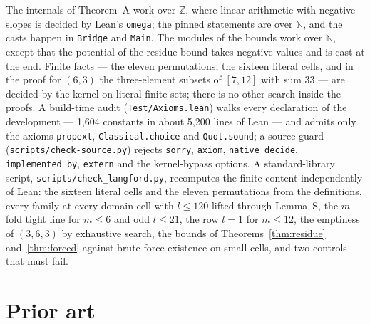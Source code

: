 \documentclass[11pt]{amsart}
\theoremstyle{plain}
\theoremstyle{definition}
\theoremstyle{remark}
\newcommand{\Z}{\mathbb{Z}}
\begin{document}
The internals of Theorem~A work over $\Z$, where linear arithmetic with negative slopes is
decided by Lean's \texttt{omega}; the pinned statements are over $\mathbb{N}$, and the casts
happen in \texttt{Bridge} and \texttt{Main}. The modules of the bounds work over $\mathbb{N}$,
except that the potential of the residue bound takes negative values and is cast at the end. Finite facts --- the eleven permutations, the
sixteen literal cells, and in the proof for $(6,3)$ the three-element subsets of $[7,12]$
with sum $33$ --- are decided by the kernel on literal finite sets; there is no other
search inside the proofs.
A build-time audit (\texttt{Test/Axioms.lean}) walks every declaration of the development
--- 1,604 constants in about 5,200
lines of Lean --- and admits only the axioms
\texttt{propext}, \texttt{Classical.choice} and \texttt{Quot.sound}; a source guard (\texttt{scripts/check-source.py}) rejects
\texttt{sorry}, \texttt{axiom}, \texttt{native\_decide}, \texttt{implemented\_by},
\texttt{extern} and the kernel-bypass options. A standard-library script,
\texttt{scripts/check\_langford.py}, recomputes the finite content independently of
Lean: the sixteen literal cells and the eleven permutations from the definitions, every
family at every domain cell with $l \le 120$ lifted through Lemma~S, the $m$-fold tight
line for $m \le 6$ and odd $l \le 21$, the row $l = 1$ for $m \le 12$, the emptiness of
$(3,6,3)$ by exhaustive search, the bounds of Theorems~\ref{thm:residue}
and~\ref{thm:forced} against brute-force existence on small cells, and two controls that
must fail.

\section{Prior art}\label{sec:prior}
\end{document}
